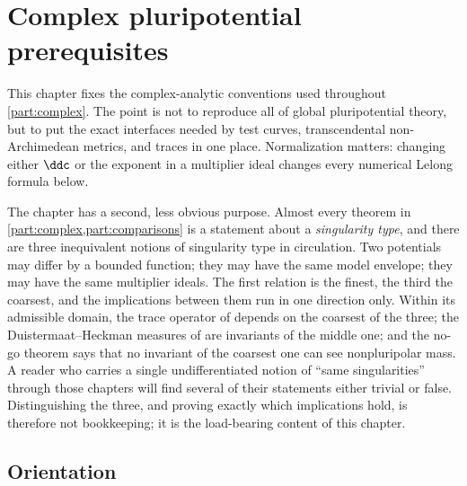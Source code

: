 \chapter{Complex pluripotential prerequisites}
%
%
%
%
%
\label{chap:complex-prerequisites}

\begingroup
{}

This chapter fixes the complex-analytic conventions used throughout
\cref{part:complex}.  The point is not to reproduce all of global pluripotential
theory, but to put the exact interfaces needed by test curves,
transcendental non-Archimedean metrics, and traces in one place.
Normalization matters: changing either $\ddc$ or the exponent in a
multiplier ideal changes every numerical Lelong formula below.

The chapter has a second, less obvious purpose.  Almost every theorem in
\cref{part:complex,part:comparisons} is a statement about a
\emph{singularity type}, and there are three inequivalent notions of
singularity type in circulation.  Two potentials may differ by a bounded
function; they may have the same model envelope; they may have the same
multiplier ideals.  The first relation is the finest, the third the
coarsest, and the implications between them run in one direction only.
Within its admissible domain, the trace operator of
 depends on the coarsest of the three;
the Duistermaat--Heckman measures of
 are invariants of the middle one;
and the no-go theorem  says that no
invariant of the coarsest one can see nonpluripolar mass.  A reader who
carries a single undifferentiated notion of ``same singularities'' through
those chapters will find several of their statements either trivial or
false.  Distinguishing the three, and proving exactly which implications
hold, is therefore not bookkeeping; it is the load-bearing content of this
chapter.

\section{Orientation}
\label{sec:ch51-orientation}

